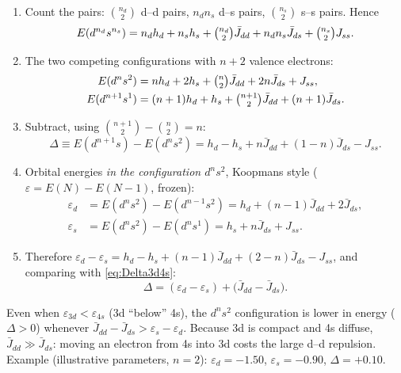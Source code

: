 \begin{enumerate}
  \item Count the pairs: $\binom{n_d}2$ d--d pairs, $n_dn_s$ d--s pairs, $\binom{n_s}2$ s--s pairs. Hence
        \begin{equation}
          E(d^{n_d}s^{n_s})=n_dh_d+n_sh_s+\tbinom{n_d}{2}\bar J_{dd}+n_dn_s\bar J_{ds}+\tbinom{n_s}{2}J_{ss}.
        \end{equation}
  \item The two competing configurations with $n+2$ valence electrons:
        \begin{align*}
          E(d^ns^2)&=nh_d+2h_s+\tbinom n2\bar J_{dd}+2n\bar J_{ds}+J_{ss},\\
          E(d^{n+1}s^1)&=(n+1)h_d+h_s+\tbinom{n+1}2\bar J_{dd}+(n+1)\bar J_{ds}.
        \end{align*}
  \item Subtract, using $\binom{n+1}2-\binom n2=n$:
        \begin{equation}\label{eq:Delta3d4s}
          \Delta\equiv E(d^{n+1}s)-E(d^ns^2)=h_d-h_s+n\bar J_{dd}+(1-n)\bar J_{ds}-J_{ss}.
        \end{equation}
  \item Orbital energies \emph{in the configuration $d^ns^2$}, Koopmans style ($\varepsilon=E(N)-E(N-1)$, frozen):
        \begin{align*}
          \varepsilon_d&=E(d^ns^2)-E(d^{n-1}s^2)=h_d+(n-1)\bar J_{dd}+2\bar J_{ds},\\
          \varepsilon_s&=E(d^ns^2)-E(d^ns^1)=h_s+n\bar J_{ds}+J_{ss}.
        \end{align*}
  \item Therefore $\varepsilon_d-\varepsilon_s=h_d-h_s+(n-1)\bar J_{dd}+(2-n)\bar J_{ds}-J_{ss}$, and comparing with \cref{eq:Delta3d4s}:
        \begin{equation}\label{eq:3d4s}
          \boxed{\Delta=(\varepsilon_d-\varepsilon_s)+\bigl(\bar J_{dd}-\bar J_{ds}\bigr).}
        \end{equation}
\end{enumerate}
\begin{resultbox}
Even when $\varepsilon_{3d}<\varepsilon_{4s}$ (3d ``below'' 4s), the $d^ns^2$ configuration is lower in energy
($\Delta>0$) whenever $\bar J_{dd}-\bar J_{ds}>\varepsilon_s-\varepsilon_d$. Because 3d is compact and 4s diffuse,
$\bar J_{dd}\gg\bar J_{ds}$: moving an electron from 4s into 3d costs the large d--d repulsion. Example
(illustrative parameters, $n=2$): $\varepsilon_d=-1.50$, $\varepsilon_s=-0.90$, $\Delta=+0.10$.
\end{resultbox}
